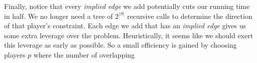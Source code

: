\documentclass{article}
\DeclareMathOperator{\w}{w}
\DeclareMathOperator{\n}{n}
\DeclareMathOperator{\pairs}{pairs}
\begin{document}
Finally, notice that every \emph{implied edge} we add potentially cuts our running time in half. We no longer need a tree of $2^{\lvert S \rvert}$ recursive calls to determine the direction of that player's constraint. Each edge we add that has an \emph{implied edge} gives us some extra leverage over the problem. Heuristically, it seems like we should exert this leverage as early as possible. So a small efficiency is gained by choosing players $p$ where the number of overlapping 
\begin{comment}
Let $P$ be the set of $n$ players.\\
Let $R$ be a set of $n$ triplets $(x,y,z)$ where $y=\w(x), z=\n(x)$, $x,y,z \in P$. \\ %
Let $\pairs((x,y,z)) = \{(x,y),(x,z),(y,z),(y,x),(z,x),(z,y)\}$\\
Let $A = \bigcup\limits_{r\in R} \pairs(r)$\\
Let $G = (V,E)$ be a directed graph, where $V \subseteq P$. We interpret an edge $(a,b) \in E$ to represent the statement `$a$ appears to the left of $b$ in a (one-dimensional) solution to the Ninja Assassin Wonderwall problem on $R$.' \\

\begin{codebox}
\Procname{$\proc{FindOrdering}(R)$}
\li Let $(a,b) \in A$. 
\li $G \gets (\emptyset, \emptyset)$
\li $ReverseChecked \gets \const{True}$
\li $G \gets \proc{MakeAssumption}(G, (a,b), R, ReverseChecked)$
\li \If $G$ is acyclic:
\li \Do
        \kw{output} $\proc{TopologicalSort}(G)$
\li \Else
        \kw{output} ``No ordering exists"
    \End
\end{codebox}

\begin{codebox}
\Procname{$\proc{MakeAssumption}(G, pair, R, ReverseChecked)$}
\li $W \gets G$ \Comment W is a working copy of G
\li $Q \gets \emptyset$
\li $\proc{Enqueue}(Q,pair)$
\li \While $\attrib{Q}{length} > 0$ 
\li \Do
        $(a,b) \gets \proc{Dequeue}(Q)$
\li     $\attrib{W}{E} \gets \attrib{W}{E} \cup \{(a,b)\}$
\li     Add to $W$ and $Q$ every edge (not already in $W$) that is implied by the edge $(a,b)$
\zi  \Comment e.g. If $(a,b) \in \attrib{W}{E}$ and $(a,b,c) \in R$, add edge $(b,c)$
\li     Add to $W$ and $Q$ the edges (not already in $W$) implied by the Transitive property.
\zi  \Comment e.g. If $(a,b),(b,c) \in \attrib{W}{E}$, add edge $(a,c)$
    \End %
\li \If $W$ is acyclic
\li \Do
        \If $\attrib{W}{V} \isequal P$
\li     \Do
            \Return $W$ \Comment Success!
\li        \Else
\li         Let $(a,b) \in A \setminus \attrib{W}{E}$. \Comment Make another guess.
\li         $ReverseChecked \gets \const{false}$
\li         \Return $\proc{MakeAssumption}(W,(a,b), R, ReverseChecked)$
        \End
\li \ElseIf not $ReverseChecked$
\li \Do
        Let $(a,b) = pair$.
\li     $ReverseCheceked = \const{true}$
\li     \Return $\proc{MakeAssumption}(G, (b,a), R, ReverseChecked)$
\li \Else
        \Return $W$ \Comment both (a,b) and (b,a) lead to a contradiction. No solution.
    \End
\end{codebox} 


\end{comment}
\end{document}
